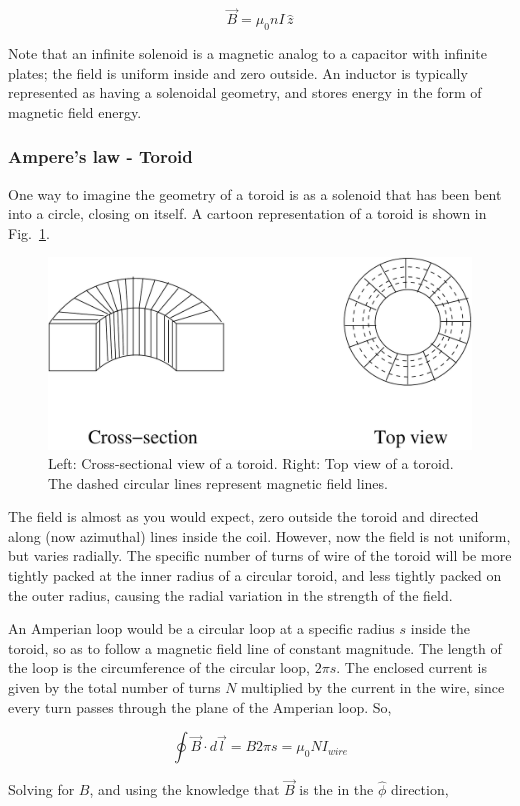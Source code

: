 \documentclass[12pt]{article}
\begin{document}
\begin{flushleft}
\[
\vec{B} = \mu_{0}nI \,\hat{z}
\]

Note that an infinite solenoid is a magnetic analog to a capacitor with infinite plates; the field is uniform inside and zero outside.  An inductor is typically represented as having a solenoidal geometry, and stores energy in the form of magnetic field energy.

\subsubsection*{\bf Ampere's law - Toroid}

One way to imagine the geometry of a toroid is as a solenoid that has been bent into a circle, closing on itself.  A cartoon representation of a toroid is shown in Fig.~\ref{fig:toroid}.  

\begin{figure}[h]
\centering
\includegraphics*[trim=0cm 0cm 0cm 0cm, clip=true, width=0.5\columnwidth]{toroid.pdf}
\caption{\small Left: Cross-sectional view of a toroid.  Right: Top view of a toroid.  The dashed circular lines represent magnetic field lines.}
\label{fig:toroid}
\end{figure}

The field is almost as you would expect, zero outside the toroid and directed along (now azimuthal) lines inside the coil.  However, now the field is not uniform, but varies radially.  The specific number of turns of wire of the toroid will be more tightly packed at the inner radius of a circular toroid, and less tightly packed on the outer radius, causing the radial variation in the strength of the field.

An Amperian loop would be a circular loop at a specific radius $s$ inside the toroid, so as to follow a magnetic field line of constant magnitude.  The length of the loop is the circumference of the circular loop, $2\pi s$.  The enclosed current is given by the total number of turns $N$ multiplied by the current in the wire, since every turn passes through the plane of the Amperian loop.  So,

\[
\oint \vec{B} \cdot d\vec{l} = B2\pi s = \mu_{0}NI_{wire}
\]

Solving for $B$, and using the knowledge that $\vec{B}$ is the in the $\hat{\phi}$ direction,


\end{flushleft}
\end{document}
